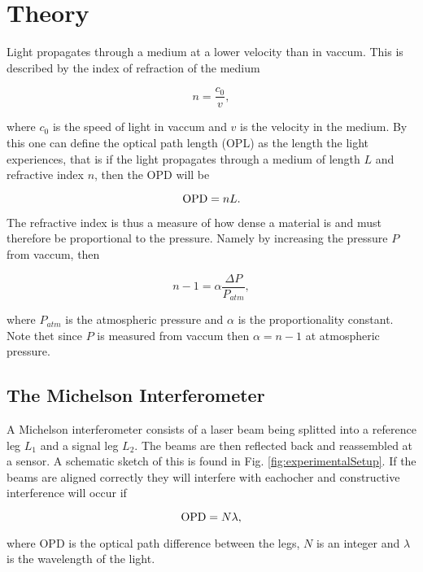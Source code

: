 \section{Theory}

Light propagates through a medium at a lower velocity than in vaccum. This is described by the index of refraction of the medium

\begin{equation}
  \label{eq:refrInd}
  n = \frac{c_0}{v},
\end{equation}

where $c_0$ is the speed of light in vaccum and $v$ is the velocity in the medium\cite{phH}. By this one can define the optical path length (OPL) as the length the light experiences, that is if the light propagates through a medium of length $L$ and refractive index $n$, then the OPD will be

\begin{equation*}
  \textnormal{OPD} = nL.
\end{equation*}

The refractive index is thus a measure of how dense a material is and must therefore be proportional to the pressure. Namely by increasing the pressure $P$ from vaccum, then

\begin{equation}
  \label{eq:refrVaccum}
  n-1 = \alpha \frac{\Delta P}{P_{atm}},
\end{equation}

where $P_{atm}$ is the atmospheric pressure and $\alpha$ is the proportionality constant. Note thet since $P$ is measured from vaccum then $\alpha=n-1$ at atmospheric pressure.

\subsection{The Michelson Interferometer}
A Michelson interferometer consists of a laser beam being splitted into a reference leg $L_1$ and a signal leg $L_2$. The beams are then reflected back and reassembled at a sensor. A schematic sketch of this is found in Fig. \ref{fig:experimentalSetup}. If the beams are aligned correctly they will interfere with eachocher and constructive interference will occur if

\begin{equation}
\label{eq:interference}
  \textnormal{OPD} = N \lambda,
\end{equation}

where OPD is the optical path difference between the legs, $N$ is an integer and $\lambda$ is the wavelength of the light. 

